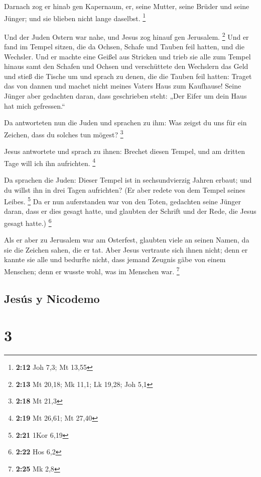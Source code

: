  Darnach zog er hinab gen Kapernaum, er, seine Mutter,
seine Brüder und seine Jünger; und sie blieben nicht lange daselbst.
\footnote{\textbf{2:12} Joh 7,3; Mt 13,55}

 Und der Juden Ostern war nahe, und Jesus zog hinauf gen
Jerusalem. \footnote{\textbf{2:13} Mt 20,18; Mk 11,1; Lk 19,28; Joh 5,1}
 Und er fand im Tempel sitzen, die da Ochsen, Schafe und
Tauben feil hatten, und die Wechsler.  Und er machte eine
Geißel aus Stricken und trieb sie alle zum Tempel hinaus samt den
Schafen und Ochsen und verschüttete den Wechslern das Geld und stieß die
Tische um  und sprach zu denen, die die Tauben feil
hatten: Traget das von dannen und machet nicht meines Vaters Haus zum
Kaufhause!  Seine Jünger aber gedachten daran, dass
geschrieben steht: „Der Eifer um dein Haus hat mich gefressen.``

 Da antworteten nun die Juden und sprachen zu ihm: Was
zeigst du uns für ein Zeichen, dass du solches tun mögest? \footnote{\textbf{2:18}
  Mt 21,3}

 Jesus antwortete und sprach zu ihnen: Brechet diesen
Tempel, und am dritten Tage will ich ihn aufrichten. \footnote{\textbf{2:19}
  Mt 26,61; Mt 27,40}

 Da sprachen die Juden: Dieser Tempel ist in
sechsundvierzig Jahren erbaut; und du willst ihn in drei Tagen
aufrichten?  (Er aber redete von dem Tempel seines
Leibes. \footnote{\textbf{2:21} 1Kor 6,19}  Da er nun
auferstanden war von den Toten, gedachten seine Jünger daran, dass er
dies gesagt hatte, und glaubten der Schrift und der Rede, die Jesus
gesagt hatte.) \footnote{\textbf{2:22} Hos 6,2}

 Als er aber zu Jerusalem war am Osterfest, glaubten
viele an seinen Namen, da sie die Zeichen sahen, die er tat.
 Aber Jesus vertraute sich ihnen nicht; denn er kannte
sie alle  und bedurfte nicht, dass jemand Zeugnis gäbe
von einem Menschen; denn er wusste wohl, was im Menschen war.
\footnote{\textbf{2:25} Mk 2,8}

\hypertarget{jesuxfas-y-nicodemo}{%
\subsection{Jesús y Nicodemo}\label{jesuxfas-y-nicodemo}}

\hypertarget{section-2}{%
\section{3}\label{section-2}}


